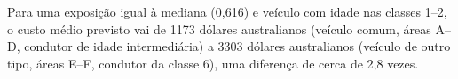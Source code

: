 Para uma exposição igual à mediana (0,616) e veículo com idade nas classes 1--2, o custo médio previsto vai de 1173 dólares australianos (veículo comum, áreas A--D, condutor de idade intermediária) a 3303 dólares australianos (veículo de outro tipo, áreas E--F, condutor da classe 6), uma diferença de cerca de 2,8 vezes.
